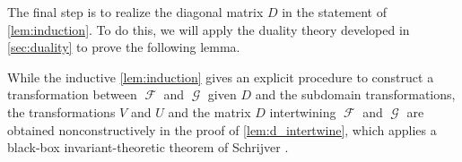 \documentclass{theoretics}
\makeatletter
\DeclareMathOperator{\rr}{\mathbb{R}}
\DeclareMathOperator{\fc}{\mathcal{F}}
\DeclareMathOperator{\gc}{\mathcal{G}}
\newcommand\IfRestateTF{%
  \ifx\label\thmt@gobble@label %
    \expandafter\@firstoftwo
  \else
    \expandafter\@secondoftwo
  \fi
}
\newcommand{\RestateRemark}{\IfRestateTF{{\normalfont\bfseries (Restated) }}{}}
\makeatother
\begin{document}
The final step is to realize the diagonal matrix $D$ in the statement of 
\autoref{lem:induction}. To do this, we will apply the duality theory developed in
\autoref{sec:duality} to prove the following lemma.

While the inductive \autoref{lem:induction} gives an explicit procedure to construct a 
transformation between $\fc$ and $\gc$ given $D$ and the subdomain transformations,
the transformations $V$ and $U$ and the matrix $D$ 
intertwining $\fc$ and $\gc$ are obtained nonconstructively in the proof of
\autoref{lem:d_intertwine}, which applies a black-box invariant-theoretic theorem of 
Schrijver \cite{schrijver_tensor_2008}.
\end{document}
